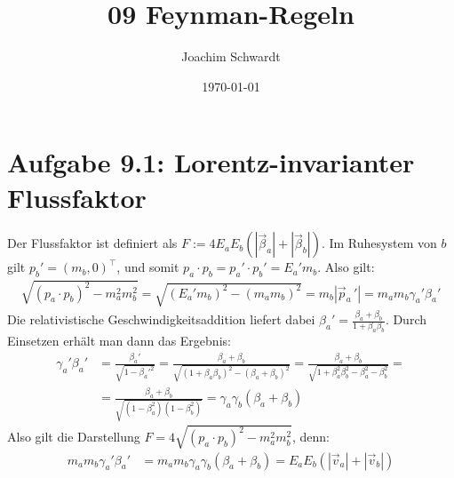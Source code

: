 \documentclass[a4paper,12pt]{article}
\begin{document}
\title{09 Feynman-Regeln}
\author{Joachim Schwardt}
\date{\today}
\maketitle

\section*{Aufgabe 9.1: Lorentz-invarianter Flussfaktor}
Der Flussfaktor ist definiert als $F:=4E_aE_b(|\vec{\beta}_a|+|\vec{\beta}_b|)$. Im Ruhesystem von $b$ gilt $p_b'=(m_b,0)^\top$, und somit $p_a\cdot p_b=p_a'\cdot p_b'=E_a'm_b$. Also gilt:
\begin{align*}
\sqrt{(p_a\cdot p_b)^2-m_a^2m_b^2}=\sqrt{(E_a'm_b)^2-(m_am_b)^2}=m_b|\vec{p}_a\,'|=m_am_b\gamma_a'\beta_a'
\end{align*}
Die relativistische Geschwindigkeitsaddition liefert dabei $\beta_a'=\frac{\beta_a+\beta_b}{1+\beta_a\beta_b}$. Durch Einsetzen erhält man dann das Ergebnis:
\begin{align*}
\gamma_a'\beta_a'&=\frac{\beta_a'}{\sqrt{1-\beta_a'^2}}=\frac{\beta_a + \beta_b}{\sqrt{(1+\beta_a\beta_b)^2-(\beta_a+\beta_b)^2}}=\frac{\beta_a+\beta_b}{\sqrt{1+\beta_a^2\beta_b^2-\beta_a^2-\beta_b^2}}=\\
&=\frac{\beta_a+\beta_b}{\sqrt{(1-\beta_a^2)(1-\beta_b^2)}}=\gamma_a\gamma_b(\beta_a+\beta_b)
\end{align*}
Also gilt die Darstellung $F=4\sqrt{(p_a\cdot p_b)^2-m_a^2m_b^2}$, denn:
\begin{align*}
m_am_b\gamma_a'\beta_a'&=m_am_b\gamma_a\gamma_b(\beta_a+\beta_b)=E_aE_b(|\vec{v}_a|+|\vec{v}_b|)
\end{align*}
\end{document}
